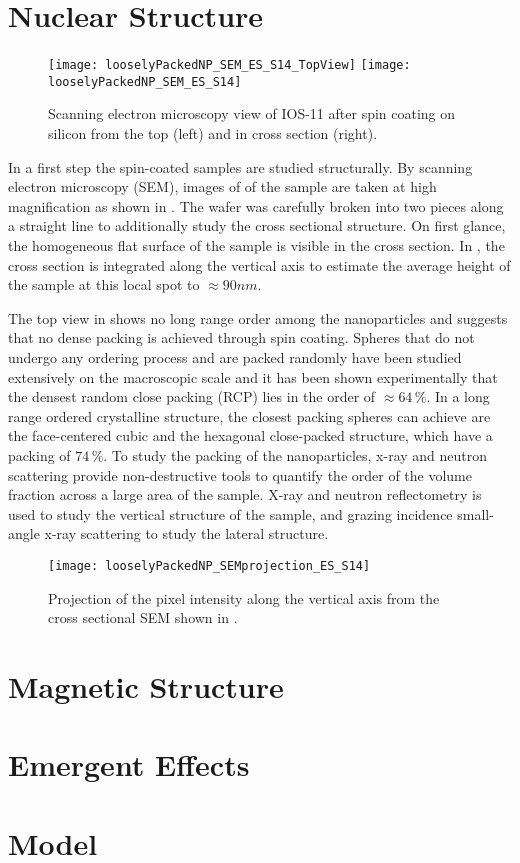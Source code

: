 \documentclass[\main/dresen_thesis.tex]{subfiles}
\begin{document}
\section{Nuclear Structure}
\begin{figure}[tb]
  \centering
  \texttt{[image: looselyPackedNP\_SEM\_ES\_S14\_TopView]}
  \texttt{[image: looselyPackedNP\_SEM\_ES\_S14]}
  \caption{\label{fig:looselyPackedNP:nuclearStructure:sem}Scanning electron microscopy view of IOS-11 after spin coating on silicon from the top (left) and in cross section (right).}
\end{figure}
In a first step the spin-coated samples are studied structurally.
By scanning electron microscopy (SEM), images of of the sample are taken at high magnification as shown in .
The wafer was carefully broken into two pieces along a straight line to additionally study the cross sectional structure.
On first glance, the homogeneous flat surface of the sample is visible in the cross section.
In , the cross section is integrated along the vertical axis to estimate the average height of the sample at this local spot to $\approx 90 \unit{nm}$.

The top view in  shows no long range order among the nanoparticles and suggests that no dense packing is achieved through spin coating.
Spheres that do not undergo any ordering process and are packed randomly have been studied extensively on the macroscopic scale \cite{Torquato_2000_IsRan} and it has been shown experimentally that the densest random close packing (RCP) lies in the order of $\approx 64 \, \%$.
In a long range ordered crystalline structure, the closest packing spheres can achieve are the face-centered cubic and the hexagonal close-packed structure, which have a packing of $74 \, \%$.
To study the packing of the nanoparticles, x-ray and neutron scattering provide non-destructive tools to quantify the order of the volume fraction across a large area of the sample.
X-ray and neutron reflectometry is used to study the vertical structure of the sample, and grazing incidence small-angle x-ray scattering to study the lateral structure.

\begin{figure}[tb]
  \centering
  \texttt{[image: looselyPackedNP\_SEMprojection\_ES\_S14]}
  \caption{\label{fig:looselyPackedNP:nuclearStructure:semProjection}Projection of the pixel intensity along the vertical axis from the cross sectional SEM shown in .}
\end{figure}

\section{Magnetic Structure}

\section{Emergent Effects}

\section{Model}
\end{document}
